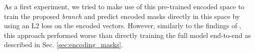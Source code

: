As a first experiment, we tried to make use of this pre-trained encoded space to train the proposed \emph{\encBr branch} and predict encoded masks directly in this space by using an L2 loss on the encoded vectors. However, similarly to the findings of \cite{hirsch2020patchperpix}, this approach performed worse than directly training the full model end-to-end as described in Sec. \ref{sec:encoding_masks}. \\



